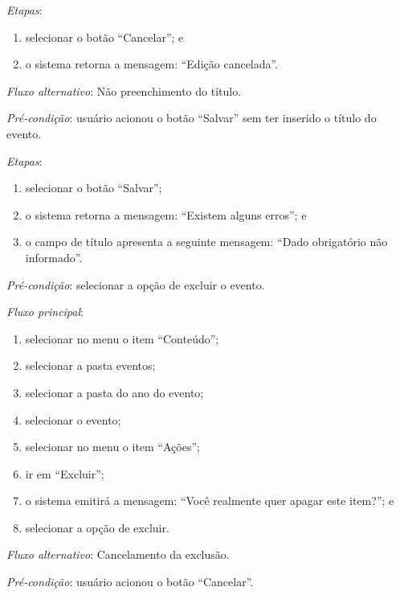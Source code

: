 \documentclass[a4paper,12pt]{article}
\begin{document}
\noindent \textit{Etapas}:

\begin{enumerate}
    \item selecionar o botão ``Cancelar''; e
    \item o sistema retorna a mensagem: ``Edição cancelada''.
\end{enumerate}

\noindent \textit{Fluxo alternativo}: Não preenchimento do título.

\noindent \textit{Pré-condição}: usuário acionou o botão ``Salvar'' sem ter inserido o título do evento.

\noindent \textit{Etapas}:

\begin{enumerate}
    \item selecionar o botão ``Salvar'';
    \item o sistema retorna a mensagem: ``Existem alguns erros''; e
    \item o campo de título apresenta a seguinte mensagem: ``Dado obrigatório não informado''.
\end{enumerate}



\vspace{0.7cm}

\noindent \textit{Pré-condição}: selecionar a opção de excluir o evento.

\noindent \textit{Fluxo principal}:

\begin{enumerate}
    \item selecionar no menu o item ``Conteúdo'';
    \item selecionar a pasta eventos;
    \item selecionar a pasta do ano do evento;
    \item selecionar o evento;
    \item selecionar no menu o item ``Ações'';
    \item ir em ``Excluir'';
    \item o sistema emitirá a mensagem: ``Você realmente quer apagar este item?''; e
    \item selecionar a opção de excluir.
\end{enumerate}

\noindent \textit{Fluxo alternativo}: Cancelamento da exclusão.

\noindent \textit{Pré-condição}: usuário acionou o botão ``Cancelar''.
\end{document}
